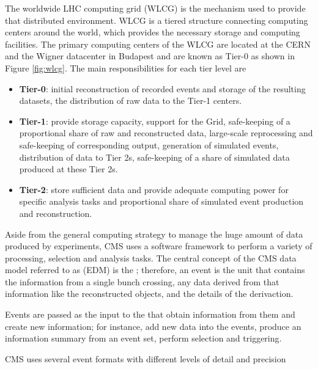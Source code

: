 The worldwide LHC computing grid (WLCG) is the mechanism used to provide that distributed environment. WLCG is a tiered structure connecting computing centers around the world, which provides the necessary storage and computing facilities. The primary computing centers of the WLCG are located at the CERN and the Wigner datacenter in Budapest and are known as Tier-0 as shown in Figure \ref{fig:wlcg}. The main responsibilities for each tier level are \cite{wlcg}

\begin{itemize}
\item \textbf{Tier-0}: initial reconstruction of recorded events and storage of the resulting datasets, the distribution of raw data to the Tier-1 centers.
\item \textbf{Tier-1}: provide storage capacity, support for the Grid, safe-keeping of a proportional share of raw and reconstructed data, large-scale reprocessing and safe-keeping of corresponding output, generation of simulated events, distribution of data to Tier 2s, safe-keeping of a share of simulated data produced at these Tier 2s.
\item \textbf{Tier-2}: store sufficient data and provide adequate computing power for specific analysis tasks and proportional share of simulated event production and reconstruction.
\end{itemize}

Aside from the general computing strategy to manage the huge amount of data produced by experiments, CMS uses a software framework to perform a variety of processing, selection and analysis tasks. The central concept of the CMS data model referred to as  (EDM) is the ; therefore, an event is the unit that contains the information from a single bunch crossing, any data derived from that information like the reconstructed objects, and the details of the derivaction.

Events are passed as the input to the  that obtain information from them and create new information; for instance,  add new data into the events,  produce an information summary from an event set,  perform selection and triggering.

CMS uses several event formats with different levels of detail and precision

